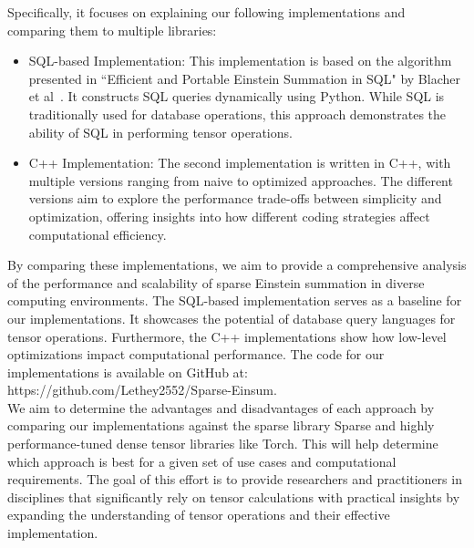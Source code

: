 Specifically, it focuses on explaining our following implementations and comparing them
to multiple libraries:
%
\begin{itemize}
      \item SQL-based Implementation:
            This implementation is based on the algorithm presented in ``Efficient and
            Portable Einstein Summation in SQL" by Blacher et al~\cite{sql_einsum}.
            It constructs SQL queries dynamically using Python. While SQL is
            traditionally used for database operations, this approach demonstrates
            the ability of SQL in performing tensor operations.
      \item C++ Implementation: The second implementation is written in C++, with multiple
            versions ranging from naive to optimized approaches. The different versions
            aim to explore the performance trade-offs between simplicity and optimization,
            offering insights into how different coding strategies affect computational
            efficiency.
\end{itemize}
%
%
By comparing these implementations, we aim to provide a comprehensive analysis of
the performance and scalability of sparse Einstein summation in diverse computing
environments. The SQL-based implementation serves as a baseline for our implementations.
It showcases the potential of database query languages for tensor operations.
Furthermore, the C++ implementations show how low-level optimizations impact
computational performance. The code for our implementations is available on
GitHub at: https://github.com/Lethey2552/Sparse-Einsum.
\\
We aim to determine the advantages and disadvantages of each approach by comparing
our implementations against the sparse library Sparse and highly performance-tuned
dense tensor libraries like Torch. This will help determine which approach is best
for a given set of use cases and computational requirements. The goal of this effort
is to provide researchers and practitioners in disciplines that significantly rely
on tensor calculations with practical insights by expanding the understanding of
tensor operations and their effective implementation.